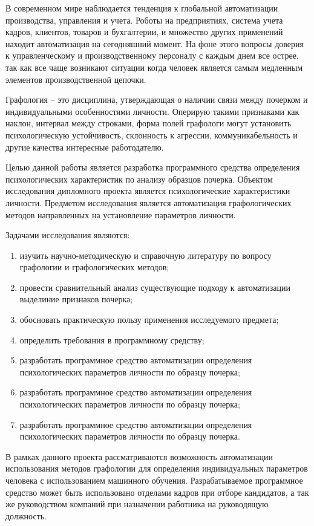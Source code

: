 \label{sec:intro}

В современном мире наблюдается тенденция к глобальной автоматизации производства, управления и учета. Роботы на предприятиях, система учета кадров, клиентов, товаров и бухгалтерии, и множество других применений находит автоматизация на сегодняшний момент.
На фоне этого вопросы доверия к управленческому и производственному персоналу с каждым днем все острее, так как все чаще возникают ситуации когда человек является самым медленным элементов производственной цепочки.

Графология – это дисциплина, утверждающая о наличии связи между почерком и индивидуальными особенностями личности. Оперирую такими признаками как наклон, интервал между строками, форма полей графологи могут установить психологическую устойчивость, склонность к агрессии, коммуникабельность и другие качества интересные работодателю.

Целью данной работы является разработка программного средства определения психологических характеристик по анализу образцов почерка.
Объектом исследования дипломного проекта является психологические характеристики личности.
Предметом исследования является автоматизация графологических методов направленных на установление параметров личности.

Задачами исследования являются:
\begin{enumerate}
  \item изучить научно-методическую и справочную литературу по вопросу графологии и графологических методов;
  \item провести сравнительный анализ существующие подходу к автоматизации выделиние признаков почерка;
  \item обосновать практическую пользу применения исследуемого \mbox{предмета};
  \item определить требования в программному средству;
  \item разработать программное средство автоматизации определения психологических параметров личности по образцу почерка;
  \item разработать программное средство автоматизации определения психологических параметров личности по образцу почерка;
  \item разработать программное средство автоматизации определения психологических параметров личности по образцу почерка.
\end{enumerate}

В рамках данного проекта рассматриваются возможность автоматизации использования методов графологии для определения индивидуальных параметров человека с использованием машинного обучения.
Разрабатываемое программное средство может быть использовано отделами кадров при отборе кандидатов, а так же руководством компаний при назначении работника на руководящую должность.